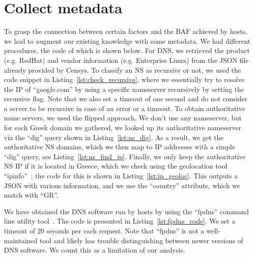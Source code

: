   



\section{Collect metadata}
\label{appendix:collect_metadata}


To grasp the connection between certain factors and the BAF achieved by hosts, we had to augment our existing knowledge with some metadata. We had different procedures, the code of which is shown below. For DNS, we retrieved the product (e.g. RedHat) and vendor information (e.g. Enterprise Linux) from the JSON file already provided by Censys. To classify an NS as recursive or not, we used the code snippet in Listing~\ref{lst:check_recursive}, where we essentially try to resolve the IP of ``google.com'' by using a specific nameserver recursively by setting the recursive flag. Note that we also set a timeout of one second and do not consider a server to be recursive in case of an error or a timeout. To obtain authoritative name servers, we used the flipped approach. We don't use any nameserver, but for each Greek domain we gathered, we looked up its authoritative nameserver via the ``dig'' query shown in Listing~\ref{lst:ns_dig}. As a result, we get the authoritative NS domains, which we then map to IP addresses with a simple ``dig'' query, see Listing~\ref{lst:ns_find_ip}. Finally, we only keep the authoritative NS IP if it is located in Greece, which we check using the geolocation tool ``ipinfo''~\cite{ipinfo}; the code for this is shown in Listing~\ref{lst:ip_geoloc}. This outputs a JSON with various information, and we use the ``country'' attribute, which we match with ``GR''. 

We have obtained the DNS software run by hosts by using the ``fpdns'' command line utility tool~\cite{fpdns_kirei}. The code is presented in Listing~\ref{lst:fpdns_code}. We set a timeout of 20 seconds per each request. Note that ``fpdns'' is not a well-maintained tool and likely has trouble distinguishing between newer versions of DNS software. We count this as a limitation of our analysis.

